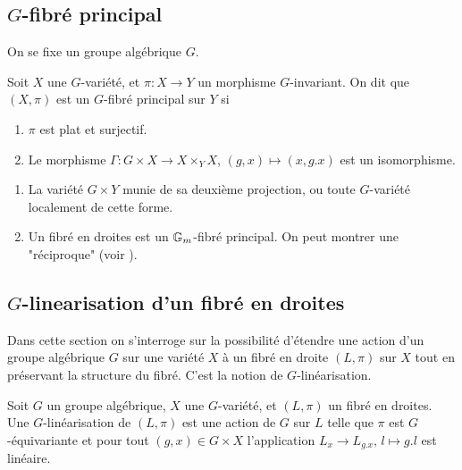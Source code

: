 \subsection{$G$-fibré principal}

\noindent On se fixe un groupe algébrique $G$.

\begin{defn}\label{GPrincipalBundleDef}
Soit $X$ une $G$-variété, et $\pi:X\rightarrow Y$ un morphisme $G$-invariant. On dit que $(X,\pi)$ est un $G$-fibré principal sur $Y$ si
\begin{enumerate}
\item $\pi$ est plat et surjectif.
\item Le morphisme $\Gamma:G\times X\rightarrow X\times_Y X$, $(g,x)\mapsto (x,g.x)$ est un isomorphisme.
\end{enumerate}
\end{defn}

\begin{ex}
\begin{enumerate}
\item La variété $G\times Y$ munie de sa deuxième projection, ou toute $G$-variété localement de cette forme.
\item Un fibré en droites est un $\mathbb{G}_m$-fibré principal. On peut montrer une "réciproque" (voir \cite[3.1.3]{LinearizationGBrion}).
\end{enumerate}
\end{ex}

\subsection{$G$-linearisation d'un fibré en droites}

Dans cette section on s'interroge sur la possibilité d'étendre une action d'un groupe algébrique $G$ sur une variété $X$ à un fibré en droite $(L,\pi)$ sur $X$ tout en préservant la structure du fibré. C'est la notion de $G$-linéarisation. 

\begin{defn}[$G$-linéarisation]
Soit $G$ un groupe algébrique, $X$ une $G$-variété, et $(L,\pi)$ un fibré en droites. Une $G$-linéarisation de  $(L,\pi)$ est une action de $G$ sur $L$ telle que $\pi$ est $G$-équivariante et pour tout $(g,x)\in G\times X$ l'application $L_x\rightarrow L_{g.x},\, l\mapsto g.l$ est linéaire.
\end{defn}

